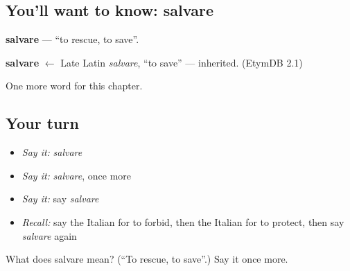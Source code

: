 \subsection*{You'll want to know: salvare}
\textbf{salvare} — \textquotedblleft{}to rescue, to save\textquotedblright{}.

\begin{cousinweb}
\textbf{salvare} $\leftarrow$ Late Latin \emph{salvare}, \textquotedblleft{}to save\textquotedblright{} — inherited. (EtymDB 2.1)
\end{cousinweb}

\begin{grammarlens}[title={What you've built}]
One more word for this chapter.
\end{grammarlens}

\subsection*{Your turn}
\begin{itemize}
\raggedright
  \item \emph{Say it:} \emph{salvare}
  \item \emph{Say it:} \emph{salvare}, once more
  \item \emph{Say it:} say \emph{salvare}
  \item \emph{Recall:} say the Italian for to forbid, then the Italian for to protect, then say \emph{salvare} again
\end{itemize}

\begin{tcolorbox}[breakable,colback=teal!4,colframe=teal!35!black,title={Before you move on}]
What does salvare mean? (\textquotedblleft{}To rescue, to save\textquotedblright{}.) Say it once more.
\end{tcolorbox}
